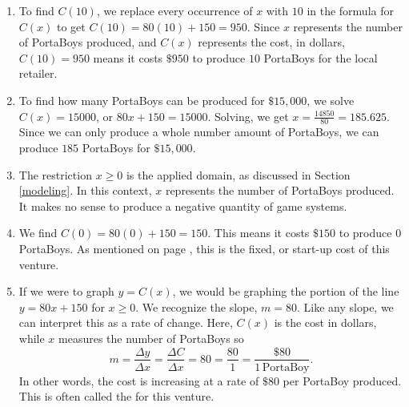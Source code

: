 {
\begin{enumerate}

\item  To find $C(10)$, we replace every occurrence of $x$ with $10$ in the formula for $C(x)$ to get $C(10) = 80(10)+150 = 950$.  Since $x$ represents the number of PortaBoys produced, and $C(x)$ represents the cost, in dollars, $C(10) = 950$ means it costs $\$950$ to produce $10$ PortaBoys for the local retailer.

\item  To find how many PortaBoys can be produced for $\$15, \! 000$, we solve $C(x) = 15000$, or $80x+150 = 15000$.  Solving, we get  $x = \frac{14850}{80} = 185.625$. Since we can only produce a whole number amount of PortaBoys, we can produce $185$ PortaBoys for $\$15, \! 000$. 


\item  The restriction $x \geq 0$ is the applied domain, as discussed in Section \ref{modeling}.  In this context, $x$ represents the number of PortaBoys produced.  It makes no sense to produce a negative quantity of game systems.


\item  We find $C(0) = 80(0)+150 = 150$.  This means it costs $\$150$ to produce $0$ PortaBoys.  As mentioned on page \pageref{pricerevenuecostprofit}, this is the fixed, or start-up cost of this venture.

\item  If we were to graph $y = C(x)$, we would be graphing the portion of the line $y = 80x + 150$ for $x \geq 0$.  We recognize the slope, $m = 80$.  Like any slope, we can interpret this as a rate of change.  Here, $C(x)$ is the cost in dollars, while $x$ measures the number of PortaBoys so \[ m = \dfrac{\Delta y}{\Delta x} = \dfrac{\Delta C}{\Delta x} = 80 = \dfrac{80}{1} = \dfrac{\$ 80}{1 \, \mbox{PortaBoy}}.\] In other words,  the cost is increasing at a rate of $\$80$ per PortaBoy produced.  This is often called the  for this venture.  

\end{enumerate}
}

\medskip

